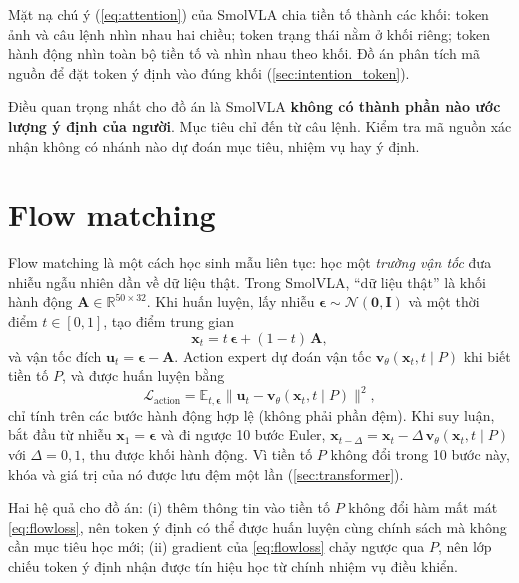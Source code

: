 \documentclass[a4paper,oneside]{report}
\newcommand{\R}{\mathbb{R}}
\begin{document}
Mặt nạ chú ý (\cref{eq:attention}) của SmolVLA chia tiền tố thành các khối: token ảnh và câu lệnh nhìn nhau hai chiều; token trạng thái nằm ở khối riêng; token hành động nhìn toàn bộ tiền tố và nhìn nhau theo khối. Đồ án phân tích mã nguồn để đặt token ý định vào đúng khối (\cref{sec:intention_token}).

Điều quan trọng nhất cho đồ án là SmolVLA \textbf{không có thành phần nào ước lượng ý định của người}. Mục tiêu chỉ đến từ câu lệnh. Kiểm tra mã nguồn xác nhận không có nhánh nào dự đoán mục tiêu, nhiệm vụ hay ý định.

\section{Flow matching}
\label{sec:flow}

Flow matching \citep{lipman2023flow} là một cách học sinh mẫu liên tục: học một \textit{trường vận tốc} đưa nhiễu ngẫu nhiên dần về dữ liệu thật. Trong SmolVLA, ``dữ liệu thật'' là khối hành động $\mathbf{A}\in\R^{50\times 32}$. Khi huấn luyện, lấy nhiễu $\boldsymbol{\epsilon}\sim\mathcal{N}(\mathbf{0},\mathbf{I})$ và một thời điểm $t\in[0,1]$, tạo điểm trung gian
\begin{equation}
  \mathbf{x}_t = t\,\boldsymbol{\epsilon} + (1-t)\,\mathbf{A},
\end{equation}
và vận tốc đích $\mathbf{u}_t = \boldsymbol{\epsilon} - \mathbf{A}$. Action expert dự đoán vận tốc $\mathbf{v}_\theta(\mathbf{x}_t, t \mid P)$ khi biết tiền tố $P$, và được huấn luyện bằng
\begin{equation}
  \mathcal{L}_{\mathrm{action}} = \mathbb{E}_{t,\boldsymbol{\epsilon}}\big\lVert \mathbf{u}_t - \mathbf{v}_\theta(\mathbf{x}_t, t\mid P)\big\rVert^2 ,
  \label{eq:flowloss}
\end{equation}
chỉ tính trên các bước hành động hợp lệ (không phải phần đệm). Khi suy luận, bắt đầu từ nhiễu $\mathbf{x}_1=\boldsymbol{\epsilon}$ và đi ngược 10 bước Euler, $\mathbf{x}_{t-\Delta} = \mathbf{x}_t - \Delta\,\mathbf{v}_\theta(\mathbf{x}_t,t\mid P)$ với $\Delta=0{,}1$, thu được khối hành động. Vì tiền tố $P$ không đổi trong 10 bước này, khóa và giá trị của nó được lưu đệm một lần (\cref{sec:transformer}).

Hai hệ quả cho đồ án: (i) thêm thông tin vào tiền tố $P$ không đổi hàm mất mát \cref{eq:flowloss}, nên token ý định có thể được huấn luyện cùng chính sách mà không cần mục tiêu học mới; (ii) gradient của \cref{eq:flowloss} chảy ngược qua $P$, nên lớp chiếu token ý định nhận được tín hiệu học từ chính nhiệm vụ điều khiển.
\end{document}
